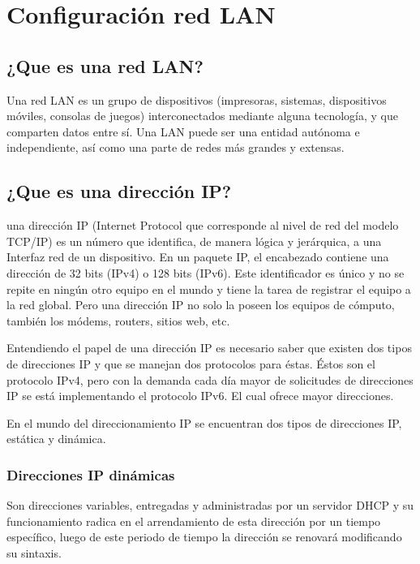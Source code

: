 \chapter{Configuración red LAN}\label{ch:red lan}

	\section{¿Que es una red LAN?}
	
		Una red LAN es un grupo de dispositivos (impresoras, sistemas, dispositivos móviles, consolas de juegos) interconectados mediante alguna tecnología, y que comparten datos entre sí. Una LAN puede ser una entidad autónoma e independiente, así como una parte de redes más grandes y extensas.\par

		
	\section{¿Que es una dirección IP?}
		
		una dirección IP (Internet Protocol que corresponde al nivel de red del modelo TCP/IP) es un número que identifica, de manera lógica y jerárquica, a una Interfaz red de un dispositivo. En un paquete IP, el
		encabezado contiene una dirección de 32 bits (IPv4) o 128 bits (IPv6). Este identificador es único y no se repite en ningún otro equipo en el mundo y tiene la tarea de registrar el equipo a la red global. Pero una dirección IP no solo la poseen los equipos de cómputo, también los módems, routers, sitios web, etc.\par
		
		Entendiendo el papel de una dirección IP es necesario saber que existen dos tipos de direcciones IP y que se manejan dos protocolos para éstas. Éstos son el protocolo IPv4, pero con la demanda cada día mayor de solicitudes de direcciones IP se está implementando el protocolo IPv6. El cual ofrece mayor direcciones.\par En el mundo del direccionamiento IP se encuentran dos tipos de direcciones IP, estática y dinámica. \par
		
		\subsection{Direcciones IP dinámicas}
			
			Son direcciones variables, entregadas y administradas por un servidor DHCP y su funcionamiento radica en el arrendamiento de esta dirección por un tiempo específico, luego de este periodo de tiempo la dirección se renovará modificando su sintaxis.\par
		
